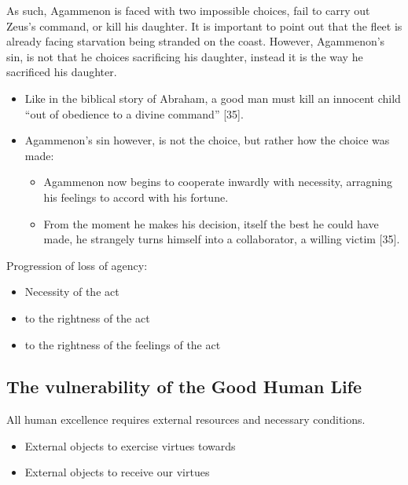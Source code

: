 \documentclass[
  letterpaper,
  DIV=11,
  numbers=noendperiod]{scrreprt}
\providecommand{\tightlist}{%
  \setlength{\itemsep}{0pt}\setlength{\parskip}{0pt}}\usepackage{longtable,booktabs,array}
\begin{document}
\begin{tcolorbox}[enhanced jigsaw, arc=.35mm, breakable, rightrule=.15mm, colback=white, colframe=quarto-callout-important-color-frame, bottomrule=.15mm, leftrule=.75mm, opacityback=0, toprule=.15mm, left=2mm]
\begin{tcolorbox}[enhanced jigsaw, arc=.35mm, breakable, rightrule=.15mm, colback=white, colframe=quarto-callout-tip-color-frame, bottomrule=.15mm, leftrule=.75mm, opacityback=0, toprule=.15mm, left=2mm]
As such, Agammenon is faced with two impossible choices, fail to carry
out Zeus's command, or kill his daughter. It is important to point out
that the fleet is already facing starvation being stranded on the coast.
However, Agammenon's sin, is not that he choices sacrificing his
daughter, instead it is the way he sacrificed his daughter.

\begin{itemize}
\tightlist
\item
  Like in the biblical story of Abraham, a good man must kill an
  innocent child ``out of obedience to a divine command'' {[}35{]}.
\item
  Agammenon's sin however, is not the choice, but rather how the choice
  was made:

  \begin{itemize}
  \tightlist
  \item
    Agammenon now begins to cooperate inwardly with necessity, arragning
    his feelings to accord with his fortune.
  \item
    From the moment he makes his decision, itself the best he could have
    made, he strangely turns himself into a collaborator, a willing
    victim {[}35{]}.
  \end{itemize}
\end{itemize}

Progression of loss of agency:

\begin{itemize}
\tightlist
\item
  Necessity of the act
\item
  to the rightness of the act
\item
  to the rightness of the feelings of the act
\end{itemize}

\subsection{The vulnerability of the Good Human
Life}\label{the-vulnerability-of-the-good-human-life-1}

All human excellence requires external resources and necessary
conditions.

\begin{itemize}
\tightlist
\item
  External objects to exercise virtues towards
\item
  External objects to receive our virtues
\end{itemize}


\end{tcolorbox}
\end{tcolorbox}
\end{document}
